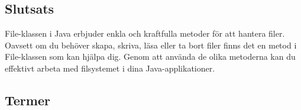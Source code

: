 \hypertarget{slutsats}{%
\subsection{Slutsats}\label{slutsats}}

File-klassen i Java erbjuder enkla och kraftfulla metoder för att
hantera filer. Oavsett om du behöver skapa, skriva, läsa eller ta bort
filer finns det en metod i File-klassen som kan hjälpa dig. Genom att
använda de olika metoderna kan du effektivt arbeta med filsystemet i
dina Java-applikationer.

\hypertarget{termer}{%
\subsection{Termer}\label{termer}}


